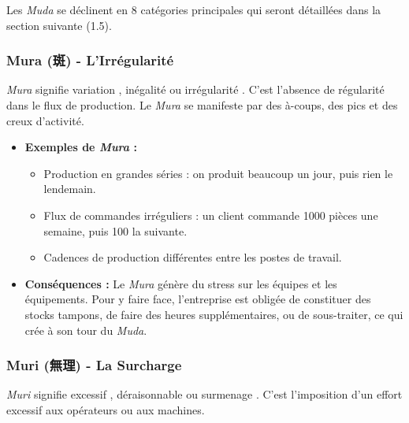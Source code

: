 \documentclass[a4paper,12pt]{article}
\begin{document}
\begin{center}
\end{center}

Les \textit{Muda} se déclinent en 8 catégories principales qui seront détaillées dans la section suivante (1.5).

\subsubsection{Mura (斑) - L'Irrégularité}

\textit{Mura} signifie \og variation \fg, \og inégalité \fg{} ou \og irrégularité \fg. C'est l'absence de régularité dans le flux de production. Le \textit{Mura} se manifeste par des à-coups, des pics et des creux d'activité.

\begin{itemize}
    \item \textbf{Exemples de \textit{Mura} :}
    \begin{itemize}
        \item Production en grandes séries : on produit beaucoup un jour, puis rien le lendemain.
        \item Flux de commandes irréguliers : un client commande 1000 pièces une semaine, puis 100 la suivante.
        \item Cadences de production différentes entre les postes de travail.
    \end{itemize}
    \item \textbf{Conséquences :} Le \textit{Mura} génère du stress sur les équipes et les équipements. Pour y faire face, l'entreprise est obligée de constituer des stocks tampons, de faire des heures supplémentaires, ou de sous-traiter, ce qui crée à son tour du \textit{Muda}.
\end{itemize}

\subsubsection{Muri (無理) - La Surcharge}

\textit{Muri} signifie \og excessif \fg, \og déraisonnable \fg{} ou \og surmenage \fg. C'est l'imposition d'un effort excessif aux opérateurs ou aux machines.
\end{document}
